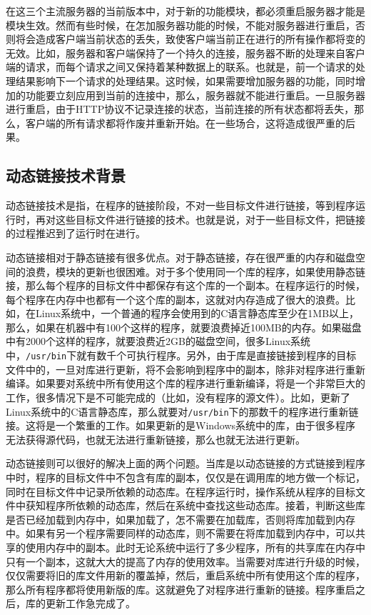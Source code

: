 \documentclass[twoside, xetex]{report}
\begin{document}
	在这三个主流服务器的当前版本中，对于新的功能模块，都必须重启服务器才能是模块生效。然而有些时候，在怎加服务器功能的时候，不能对服务器进行重启，否则将会造成客户端当前状态的丢失，致使客户端当前正在进行的所有操作都将变的无效。比如，服务器和客户端保持了一个持久的连接，服务器不断的处理来自客户端的请求，而每个请求之间又保持着某种数据上的联系。也就是，前一个请求的处理结果影响下一个请求的处理结果。这时候，如果需要增加服务器的功能，同时增加的功能要立刻应用到当前的连接中，那么，服务器就不能进行重启。一旦服务器进行重启，由于HTTP协议不记录连接的状态，当前连接的所有状态都将丢失，那么，客户端的所有请求都将作废并重新开始。在一些场合，这将造成很严重的后果。
	
\subsection{动态链接技术背景}
	动态链接技术是指，在程序的链接阶段，不对一些目标文件进行链接，等到程序运行时，再对这些目标文件进行链接的技术。也就是说，对于一些目标文件，把链接的过程推迟到了运行时在进行。
	
	动态链接相对于静态链接有很多优点。对于静态链接，存在很严重的内存和磁盘空间的浪费，模块的更新也很困难。对于多个使用同一个库的程序，如果使用静态链接，那么每个程序的目标文件中都保存有这个库的一个副本。在程序运行的时候，每个程序在内存中也都有一个这个库的副本，这就对内存造成了很大的浪费。比如，在Linux系统中，一个普通的程序会使用到的C语言静态库至少在1MB以上，那么，如果在机器中有100个这样的程序，就要浪费掉近100MB的内存。如果磁盘中有2000个这样的程序，就要浪费近2GB的磁盘空间，很多Linux系统中，\verb|/usr/bin|下就有数千个可执行程序。另外，由于库是直接链接到程序的目标文件中的，一旦对库进行更新，将不会影响到程序中的副本，除非对程序进行重新编译。如果要对系统中所有使用这个库的程序进行重新编译，将是一个非常巨大的工作，很多情况下是不可能完成的（比如，没有程序的源文件）。比如，更新了Linux系统中的C语言静态库，那么就要对\verb|/usr/bin|下的那数千的程序进行重新链接。这将是一个繁重的工作。如果更新的是Windows系统中的库，由于很多程序无法获得源代码，也就无法进行重新链接，那么也就无法进行更新。
	
	动态链接则可以很好的解决上面的两个问题。当库是以动态链接的方式链接到程序中时，程序的目标文件中不包含有库的副本，仅仅是在调用库的地方做一个标记，同时在目标文件中记录所依赖的动态库。在程序运行时，操作系统从程序的目标文件中获知程序所依赖的动态库，然后在系统中查找这些动态库。接着，判断这些库是否已经加载到内存中，如果加载了，怎不需要在加载库，否则将库加载到内存中。如果有另一个程序需要同样的动态库，则不需要在将库加载到内存中，可以共享的使用内存中的副本。此时无论系统中运行了多少程序，所有的共享库在内存中只有一个副本，这就大大的提高了内存的使用效率。当需要对库进行升级的时候，仅仅需要将旧的库文件用新的覆盖掉，然后，重启系统中所有使用这个库的程序，那么所有程序都将使用新版的库。这就避免了对程序进行重新的链接。程序重启之后，库的更新工作急完成了。
	
\end{document}
